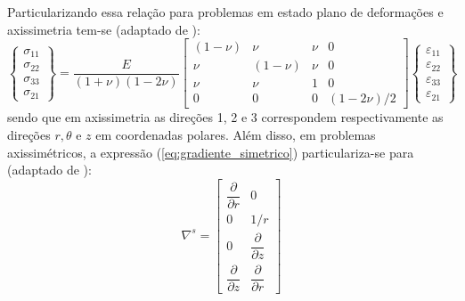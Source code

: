 Particularizando essa relação para problemas em estado plano de deformações e axissimetria tem-se (adaptado de ):
\begin{equation}
	\label{eq:Dl}
	\left\{\begin{array}{lcl}
		\sigma_{11} \\
		\sigma_{22} \\
		\sigma_{33} \\
		\sigma_{21}
	\end{array}\right\} = \dfrac{E}{(1+\nu)(1-2\nu)}
	\begin{bmatrix}
		(1-\nu)	& \nu 		& \nu  		& 0	 		\\
		\nu 	& (1-\nu)	& \nu  		& 0		 	\\
		\nu 	& \nu 		& 1   		& 0		 	\\
		0		& 0			& 0		    & (1-2\nu)/2 
	\end{bmatrix}
	\left\{\begin{array}{lcl}
		\varepsilon_{11} \\
		\varepsilon_{22} \\
		\varepsilon_{33} \\
		\varepsilon_{21}
	\end{array}\right\}
\end{equation}
sendo que em axissimetria as direções 1, 2 e 3 correspondem respectivamente as direções $r, \theta$ e $z$ em coordenadas polares. Além disso, em problemas axissimétricos, a expressão (\ref{eq:gradiente_simetrico}) particulariza-se para (adaptado de ):
\begin{equation}
	\label{eq:gradiente_simetrico_AXI_EPD}
	\nabla^s = 	\begin{bmatrix}
		\dfrac{\partial}{\partial r} & 0  \\
		0 & 1/r  \\
		0 & \dfrac{\partial}{\partial z} \\
		\dfrac{\partial}{\partial z} & \dfrac{\partial}{\partial r}	
	\end{bmatrix}
\end{equation}

